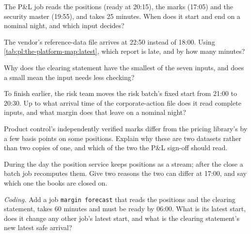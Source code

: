 \begin{exercise}[$\star$]\label{exo:pl:the-platform-map:1}
The P\&L job reads the positions (ready at 20:15), the marks (17:05) and the security master (19:55), and takes 25 minutes.
When does it start and end on a nominal night, and which input decides?
\end{exercise}

\begin{exercise}[$\star$]\label{exo:pl:the-platform-map:2}
The vendor's reference-data file arrives at 22:50 instead of 18:00. Using \cref{tab:pl:the-platform-map:latest}, which report is
late, and by how many minutes?
\end{exercise}

\begin{exercise}[$\star$]\label{exo:pl:the-platform-map:3}
Why does the clearing statement have the smallest  of the seven inputs, and does a small  mean the
input needs less checking?
\end{exercise}

\begin{exercise}[$\star\star$]\label{exo:pl:the-platform-map:4}
To finish earlier, the risk team moves the risk batch's fixed start from 21:00 to 20:30. Up to what arrival time of the
corporate-action file does it read complete inputs, and what margin does that leave on a nominal night?
\end{exercise}

\begin{exercise}[$\star\star$]\label{exo:pl:the-platform-map:5}
Product control's independently verified marks differ from the pricing library's by a few basis points on some positions.
Explain why these are two datasets rather than two copies of one, and which of the two the P\&L sign-off should read.
\end{exercise}

\begin{exercise}[$\star\star$]\label{exo:pl:the-platform-map:6}
During the day the position service keeps positions as a stream; after the close a batch job recomputes them. Give two reasons
the two can differ at 17:00, and say which one the books are closed on.
\end{exercise}

\begin{exercise}[$\star\star\star$]\label{exo:pl:the-platform-map:7}
\emph{Coding.} Add a job \texttt{margin forecast} that reads the positions and the clearing statement, takes 60 minutes and must
be ready by 06:00. What is its latest start, does it change any other job's latest start, and what is the clearing statement's
new latest safe arrival?
\end{exercise}

